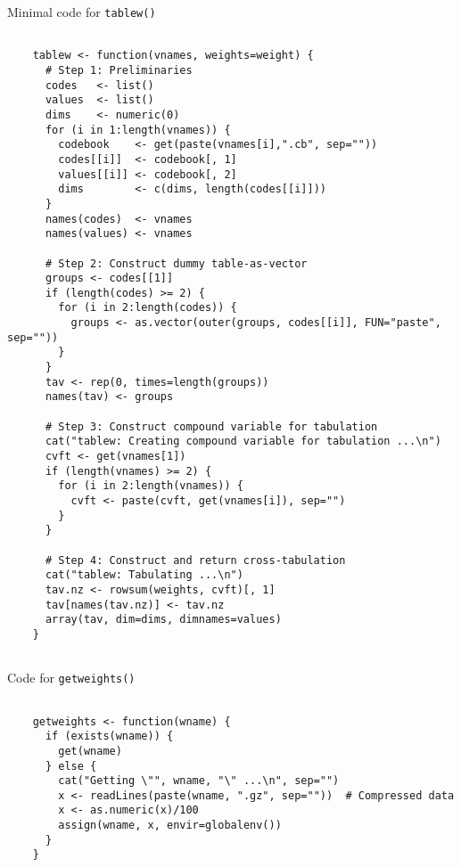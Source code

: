 \begin{table}[htbp]
\caption{Minimal code for {\tt tablew()}}
\begin{verbatim}

    tablew <- function(vnames, weights=weight) {
      # Step 1: Preliminaries
      codes   <- list()
      values  <- list()
      dims    <- numeric(0)
      for (i in 1:length(vnames)) {
        codebook    <- get(paste(vnames[i],".cb", sep=""))
        codes[[i]]  <- codebook[, 1]
        values[[i]] <- codebook[, 2]
        dims        <- c(dims, length(codes[[i]]))
      }
      names(codes)  <- vnames
      names(values) <- vnames
       
      # Step 2: Construct dummy table-as-vector
      groups <- codes[[1]]
      if (length(codes) >= 2) {
        for (i in 2:length(codes)) {
          groups <- as.vector(outer(groups, codes[[i]], FUN="paste", sep=""))    
        }
      }
      tav <- rep(0, times=length(groups))
      names(tav) <- groups
    
      # Step 3: Construct compound variable for tabulation
      cat("tablew: Creating compound variable for tabulation ...\n")
      cvft <- get(vnames[1])
      if (length(vnames) >= 2) {
        for (i in 2:length(vnames)) {
          cvft <- paste(cvft, get(vnames[i]), sep="")
        }
      }
    
      # Step 4: Construct and return cross-tabulation
      cat("tablew: Tabulating ...\n")
      tav.nz <- rowsum(weights, cvft)[, 1]
      tav[names(tav.nz)] <- tav.nz
      array(tav, dim=dims, dimnames=values)
    }
	
\end{verbatim}
\end{table}

\begin{table}
\caption{Code for {\tt getweights()}}
\begin{verbatim}

    getweights <- function(wname) {
      if (exists(wname)) {
        get(wname)
      } else {
        cat("Getting \"", wname, "\" ...\n", sep="")
        x <- readLines(paste(wname, ".gz", sep=""))  # Compressed data
        x <- as.numeric(x)/100
        assign(wname, x, envir=globalenv())
      }
    }
	
\end{verbatim}
\end{table}

